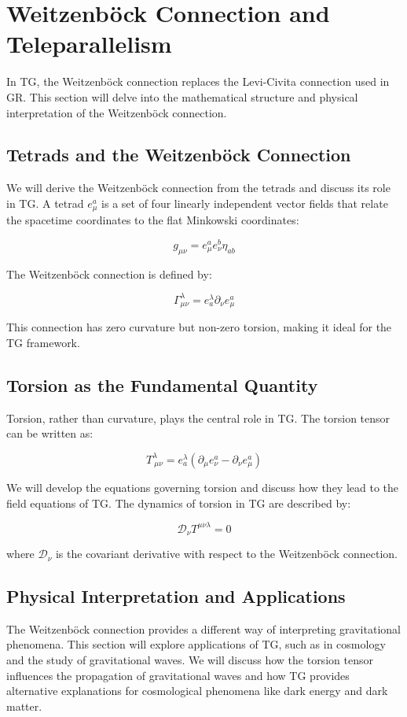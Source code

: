 \documentclass[12pt]{article}
\begin{document}
\section{Weitzenböck Connection and Teleparallelism}
In TG, the Weitzenböck connection replaces the Levi-Civita connection used in GR. This section will delve into the mathematical structure and physical interpretation of the Weitzenböck connection.

\subsection{Tetrads and the Weitzenböck Connection}
We will derive the Weitzenböck connection from the tetrads and discuss its role in TG. A tetrad \( e^a_\mu \) is a set of four linearly independent vector fields that relate the spacetime coordinates to the flat Minkowski coordinates:

\[
g_{\mu\nu} = e^a_\mu e^b_\nu \eta_{ab}
\]

The Weitzenböck connection is defined by:

\[
\Gamma^\lambda_{\mu\nu} = e^\lambda_a \partial_\nu e^a_\mu
\]

This connection has zero curvature but non-zero torsion, making it ideal for the TG framework.

\subsection{Torsion as the Fundamental Quantity}
Torsion, rather than curvature, plays the central role in TG. The torsion tensor can be written as:

\[
T^\lambda_{\ \mu\nu} = e^\lambda_a \left( \partial_\mu e^a_\nu - \partial_\nu e^a_\mu \right)
\]

We will develop the equations governing torsion and discuss how they lead to the field equations of TG. The dynamics of torsion in TG are described by:

\[
\mathcal{D}_\nu T^{\mu\nu\lambda} = 0
\]

where \( \mathcal{D}_\nu \) is the covariant derivative with respect to the Weitzenböck connection.

\subsection{Physical Interpretation and Applications}
The Weitzenböck connection provides a different way of interpreting gravitational phenomena. This section will explore applications of TG, such as in cosmology and the study of gravitational waves. We will discuss how the torsion tensor influences the propagation of gravitational waves and how TG provides alternative explanations for cosmological phenomena like dark energy and dark matter.
\end{document}
